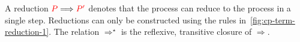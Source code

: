 \begin{definition}\label{def:cp-term-reduction-2}
  A reduction $\textcolor{red}{P}\Longrightarrow\textcolor{red}{P'}$ denotes that the process  can reduce to
  the process  in a single step. Reductions can only be constructed using
  the rules in~\cref{fig:cp-term-reduction-1}.
  The relation $\Longrightarrow^\star$ is the reflexive, transitive closure of
  $\Longrightarrow$.
\end{definition}
